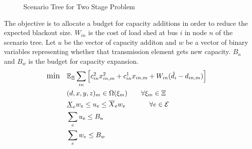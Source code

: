 \begin{figure}
\centering
{} 
\caption{Scenario Tree for Two Stage Problem}
  \label{fig:mip}
\end{figure}

The objective is to allocate a budget for capacity additions in order to reduce the expected blackout size.  $W_{in}$ is the cost of load shed at bus $i$ in node $n$ of the scenario tree.  Let $u$ be the vector of capacity additon and $w$ be a vector of binary variables representing whether that transmission element gets new capacity.  $B_u$ and $B_w$ is the budget for capacity expansion.
\begin{subequations}

\begin{align} \displaystyle
	{\large \mbox{min}} \hspace{10px} &  \Expect_\Xi \sum_{in} \left[c^2_{in}  x^2_{in,m} + c^1_{in} x_{in,m}   + W_{in} (\hat{d}_{i} - d_{in,m}) \right]	\\
	&(d,x,y,z)_m  \in \Omega(\xi_m)    \hspace{20px}   \forall \xi_m \in \Xi	\\
	& \underline{X}_e w_e \le u_e \le \overline{X}_e w_e \hspace{35px} \forall e \in \cE\\
	&\sum_e u_e \le B_u 	\\
	& \sum_e w_e \le B_w  
\end{align}
\label{TX}
\end{subequations}
